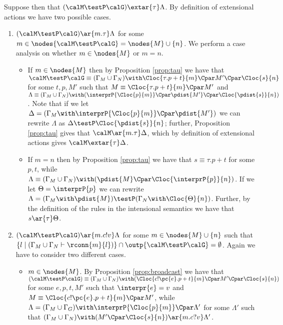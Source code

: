 \documentclass{LMCS}
\begin{document}
Suppose then that $(\calM \testP \calG) \extar{\tau} \Lambda$. 
By definition of extensional actions we have two possible cases.
\begin{enumerate}
\item $(\calM \testP \calG) \ar{m.\tau} \Lambda$ for some $m \in \nodes{\calM 
\testP \calG} = \nodes{M} \cup \{n\}$. 
We perform a case analysis on whether 
$m \in \nodes{M}$ or $m = n$.
	\begin{itemize}
	\item If $m \in \nodes{M}$ then by Proposition \ref{prop:tau} we have that 
	$\calM \testP \calG \equiv (\Gamma_M \cup \Gamma_N) \with 
	\Cloc{\tau.p+t}{m} \Cpar M' \Cpar \Cloc{s}{n}$ for some $t,p,M'$ such 
	that $M \equiv \Cloc{\tau.p+t}{m} \Cpar M'$ and $\Lambda \equiv  
	(\Gamma_M \cup \Gamma_N) \with (\interprP{\Cloc{p}{m}} \Cpar \pdist{M'} 
	\Cpar \Cloc{\pdist{s}}{n})$. Note that if we let $\Delta = (\Gamma_M \with 
	\interprP{\Cloc{p}{m}} \Cpar \pdist{M'})$ we can rewrite $\Lambda$ as 
	$\Delta \testP \Cloc{\pdist{s}}{n}$; further, Proposition \ref{prop:tau} 
	gives that $\calM \ar{m.\tau} \Delta$, which by definition of extensional 
	actions gives $\calM \extar{\tau} \Delta$.
	\item If $m = n$ then by Proposition \ref{prop:tau} we have that 
	$s \equiv \tau.p+t$ for some $p,t$, while $\Lambda \equiv 
	(\Gamma_M \cup \Gamma_N) \with (\pdist{M} \Cpar \Cloc{\interprP{p}}{n})$. 
	If we let $\Theta = \interprP{p}$ we can rewrite $\Lambda = 
	(\Gamma_M \with \pdist{M}) \testP (\Gamma_N \with \Cloc{\Theta}{n})$. 
	Further, by the definition of the rules in the intensional 
	semantics we have that $s \ar{\tau} \Theta$.
	\end{itemize}
\item $(\calM \testP \calG) \ar{m.c!v} \Lambda$ for some $m\in \nodes{M} \cup \{n\}$ 
such that $\{l \;|\; (\Gamma_M \cup \Gamma_N \vdash \rconn{m}{l})\} \cap 
\outp{\calM \testP \calG} = \emptyset$. Again we have to consider two different cases. 
	\begin{itemize}
	\item $m \in \nodes{M}$. By Proposition \ref{prop:broadcast} we have that 
	$(\calM \testP \calG) \equiv 
	(\Gamma_M \cup \Gamma_N) \with 
	(\Cloc{c!\pc{e}.p + t}{m} \Cpar M' \Cpar \Cloc{s}{n})$ 
	for some $e,p,t,M'$ such that $\interpr{e} = v$ and $M \equiv 
	\Cloc{c!\pc{e}.p+t}{m} \Cpar M'$, while 
	$\Lambda = (\Gamma_M \cup \Gamma_G) \with 
	\interprP{\Cloc{p}{m}} \Cpar \Lambda'$ for some 
	$\Lambda'$ such that $(\Gamma_M \cup \Gamma_N) 
	\with (M' \Cpar \Cloc{s}{n}) \ar{m.c?v} \Lambda'$. 

\end{itemize}
\end{enumerate}
\end{document}
